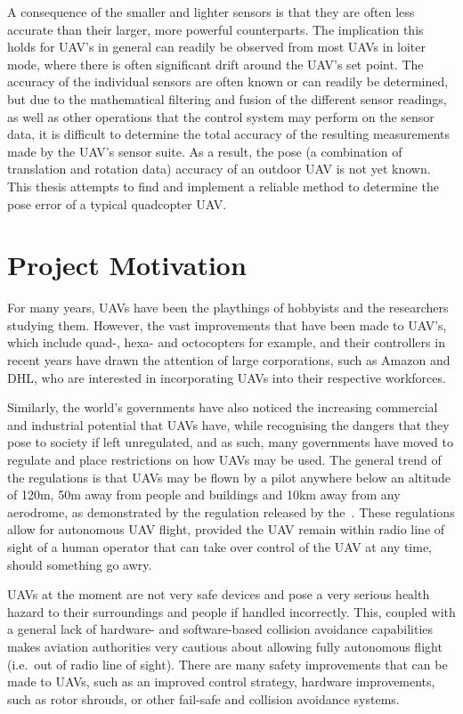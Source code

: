 A consequence of the smaller and lighter sensors is that they are often less accurate than their larger, more powerful counterparts. The implication this holds for UAV's in general can readily be observed from most UAVs in loiter mode, where there is often significant drift around the UAV's set point. The accuracy of the individual sensors are often known or can readily be determined, but due to the mathematical filtering and fusion of the different sensor readings, as well as other operations that the control system may perform on the sensor data, it is difficult to determine the total accuracy of the resulting measurements made by the UAV's sensor suite. As a result, the pose (a combination of translation and rotation data) accuracy of an outdoor UAV is not yet known. This thesis attempts to find and implement a reliable method to determine the pose error of a typical quadcopter UAV.\@  

\section{Project Motivation}

For many years, UAVs have been the playthings of hobbyists and the researchers studying them. However, the vast improvements that have been made to UAV's, which include quad-, hexa- and octocopters for example, and their controllers in recent years have drawn the attention of large corporations, such as Amazon and DHL, who are interested in incorporating UAVs into their respective workforces. 

Similarly, the world's governments have also noticed the increasing commercial and industrial potential that UAVs have, while recognising the dangers that they pose to society if left unregulated, and as such, many governments have moved to regulate and place restrictions on how UAVs may be used. The general trend of the regulations is that UAVs may be flown by a pilot anywhere below an altitude of 120m, 50m away from people and buildings and 10km away from any aerodrome, as demonstrated by the regulation released by the~\cite{sacaa-drone-regs}. These regulations allow for autonomous UAV flight, provided the UAV remain within radio line of sight of a human operator that can take over control of the UAV at any time, should something go awry. 

UAVs at the moment are not very safe devices and pose a very serious health hazard to their surroundings and people if handled incorrectly. This, coupled with a general lack of hardware- and software-based collision avoidance capabilities makes aviation authorities very cautious about allowing fully autonomous flight (i.e.\ out of radio line of sight). There are many safety improvements that can be made to UAVs, such as an improved control strategy, hardware improvements, such as rotor shrouds, or other fail-safe and collision avoidance systems. 

